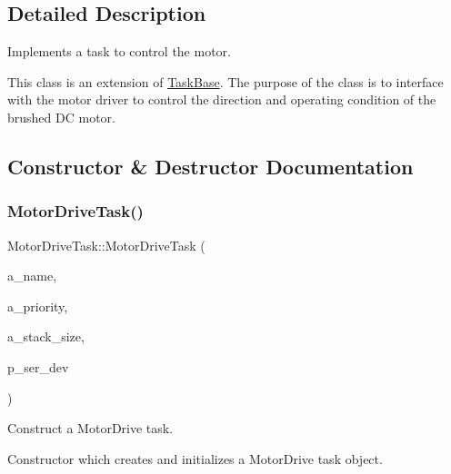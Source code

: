 \subsection{Detailed Description}
Implements a task to control the motor. 

This class is an extension of {\ttfamily \mbox{\hyperlink{class_task_base}{Task\+Base}}}. The purpose of the class is to interface with the motor driver to control the direction and operating condition of the brushed DC motor. 

\subsection{Constructor \& Destructor Documentation}
\mbox{\label{class_motor_drive_task_ae97b28489a97e5f365a5d27156153f0e}} 
\subsubsection{\texorpdfstring{Motor\+Drive\+Task()}{MotorDriveTask()}}
{\footnotesize\ttfamily Motor\+Drive\+Task\+::\+Motor\+Drive\+Task (\begin{DoxyParamCaption}\item[{const char $\ast$}]{a\+\_\+name,  }\item[{unsigned port\+B\+A\+S\+E\+\_\+\+T\+Y\+PE}]{a\+\_\+priority,  }\item[{size\+\_\+t}]{a\+\_\+stack\+\_\+size,  }\item[{\mbox{\hyperlink{classemstream}{emstream}} $\ast$}]{p\+\_\+ser\+\_\+dev }\end{DoxyParamCaption})}



Construct a Motor\+Drive task. 

Constructor which creates and initializes a Motor\+Drive task object.

